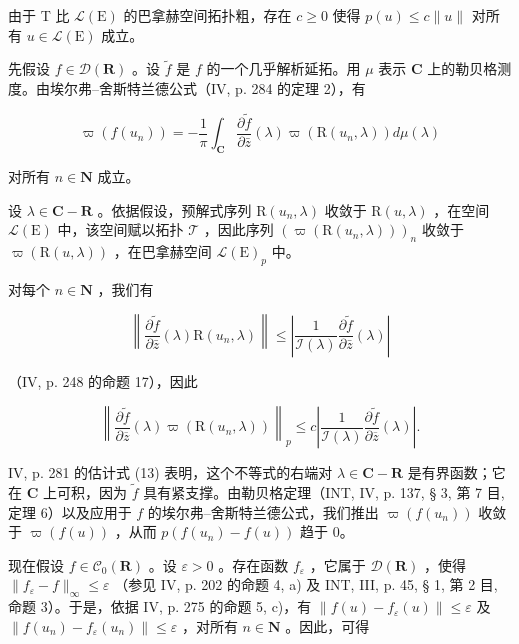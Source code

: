 由于 T 比 \(\mathcal{L}(\mathrm{E})\) 的巴拿赫空间拓扑粗，存在 \(c \geqslant 0\) 使得 \(p(u) \leqslant c \|u\|\) 对所有 \(u \in \mathcal{L}(\mathrm{E})\) 成立。

先假设 \(f \in \mathcal{D}(\mathbf{R})\) 。设 \(\tilde{f}\) 是 \(f\) 的一个几乎解析延拓。用 \(\mu\) 表示 \(\mathbf{C}\) 上的勒贝格测度。由埃尔弗--舍斯特兰德公式（IV, p. 284 的定理 2），有

\[
\varpi (f (u _ {n})) = - \frac {1}{\pi} \int_ {\mathbf {C}} \frac {\partial \widetilde {f}}{\partial \bar {z}} (\lambda) \varpi (\mathrm{R} (u _ {n}, \lambda)) d \mu (\lambda)\tag{14}
\]

对所有 \(n \in \mathbf{N}\) 成立。

设 \(\lambda \in \mathbf{C} - \mathbf{R}\) 。依据假设，预解式序列 \(\mathrm{R}(u_n,\lambda)\) 收敛于 \(\mathrm{R}(u,\lambda)\) ，在空间 \(\mathcal{L}(\mathrm{E})\) 中，该空间赋以拓扑 \(\mathcal{T}\) ，因此序列 \((\varpi (\mathrm{R}(u_n,\lambda)))_n\) 收敛于 \(\varpi (\mathrm{R}(u,\lambda))\) ，在巴拿赫空间 \(\mathcal{L}(\mathrm{E})_p\) 中。

对每个 \(n \in \mathbf{N}\) ，我们有

\[
\left\| \frac {\partial \widetilde {f}}{\partial \bar {z}} (\lambda) \mathrm{R} (u _ {n}, \lambda) \right\| \leqslant \left| \frac {1}{\mathcal{I} (\lambda)} \frac {\partial \widetilde {f}}{\partial \bar {z}} (\lambda) \right|
\]

（IV, p. 248 的命题 17），因此

\[
\left\| \frac {\partial \widetilde {f}}{\partial \overline {{z}}} (\lambda) \varpi (\mathrm{R} (u _ {n}, \lambda)) \right\| _ {p} \leqslant c \left| \frac {1}{\mathcal {I} (\lambda)} \frac {\partial \widetilde {f}}{\partial \overline {{z}}} (\lambda) \right|.
\]

IV, p. 281 的估计式 (13) 表明，这个不等式的右端对 \(\lambda \in \mathbf{C} - \mathbf{R}\) 是有界函数；它在 \(\mathbf{C}\) 上可积，因为 \(\widetilde{f}\) 具有紧支撑。由勒贝格定理（INT, IV, p. 137, § 3, 第 7 目, 定理 6）以及应用于 \(f\) 的埃尔弗--舍斯特兰德公式，我们推出 \(\varpi(f(u_n))\) 收敛于 \(\varpi(f(u))\) ，从而 \(p(f(u_n) - f(u))\) 趋于 0。

现在假设 \(f \in \mathcal{C}_0(\mathbf{R})\) 。设 \(\varepsilon > 0\) 。存在函数 \(f_{\varepsilon}\) ，它属于 \(\mathcal{D}(\mathbf{R})\) ，使得 \(\| f_{\varepsilon} - f \|_{\infty} \leqslant \varepsilon\) （参见 IV, p. 202 的命题 4, a) 及 INT, III, p. 45, § 1, 第 2 目, 命题 3）。于是，依据 IV, p. 275 的命题 5, c)，有 \(\| f(u) - f_{\varepsilon}(u) \| \leqslant \varepsilon\) 及 \(\| f(u_n) - f_{\varepsilon}(u_n) \| \leqslant \varepsilon\) ，对所有 \(n \in \mathbf{N}\) 。因此，可得

